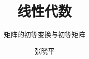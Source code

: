 \documentclass[9pt,notheorems]{beamer}
\begin{document}
\title{线性代数}
\subtitle{矩阵的初等变换与初等矩阵}
\author{张晓平}


\begin{frame}[plain]\transboxout
\titlepage
\end{frame}

\begin{frame}[allowframebreaks]\transboxin
\begin{center}
\tableofcontents[hideallsubsections]
\end{center}
\end{frame}


%
%

\end{document}
